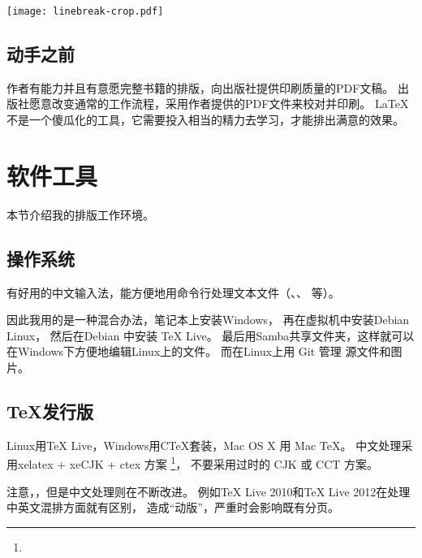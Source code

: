 \vspace{1ex}
\centerline{\texttt{[image: linebreak-crop.pdf]}}

\subsection{动手之前}
作者有能力并且有意愿完整书籍的排版，向出版社提供印刷质量的PDF文稿。
出版社愿意改变通常的工作流程，采用作者提供的PDF文件来校对并印刷。
\LaTeX 不是一个傻瓜化的工具，它需要投入相当的精力去学习，才能排出满意的效果。


\section{软件工具}
本节介绍我的排版工作环境。

\subsection{操作系统}
有好用的中文输入法，能方便地用命令行处理文本文件（、、 等）。

因此我用的是一种混合办法，笔记本上安装Windows，
再在虚拟机中安装Debian Linux，
然后在Debian 中安装 TeX Live。
最后用Samba共享文件夹，这样就可以在Windows下方便地编辑Linux上的文件。
而在Linux上用 Git 管理  源文件和图片。

\subsection{\TeX 发行版}
Linux用TeX Live，Windows用CTeX套装，Mac OS X 用 Mac TeX。
中文处理采用xelatex + xeCJK + ctex 方案
\footnote{}，
不要采用过时的 CJK 或 CCT 方案。

注意，，但是中文处理则在不断改进。
例如TeX Live 2010和TeX Live 2012在处理中英文混排方面就有区别，
造成“动版”，严重时会影响既有分页。

\vspace{1ex}
\centerline{}

\vspace{1ex}
\centerline{}

